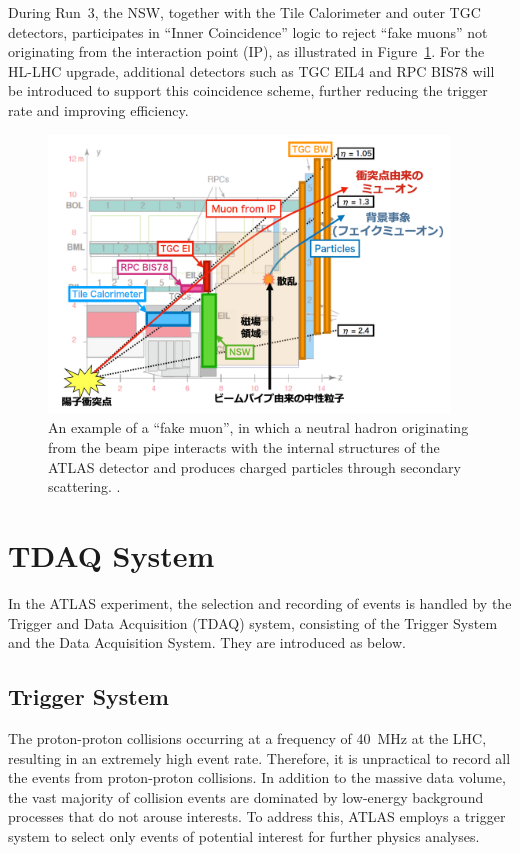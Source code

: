During Run~3, the NSW, together with the Tile Calorimeter and outer TGC detectors, participates in “Inner Coincidence” logic to reject ``fake muons'' not originating from the interaction point (IP), as illustrated in Figure~\ref{fig:InnerCoin}. For the HL-LHC upgrade, additional detectors such as TGC EIL4 and RPC BIS78 will be introduced to support this coincidence scheme, further reducing the trigger rate and improving efficiency.

\begin{figure}[htbp]
  \centering
  \includegraphics[width=0.95\textwidth]{figs/chapter2/InnerCoin.png}
  \caption{An example of a ``fake muon'', in which a neutral hadron originating from the beam pipe interacts with the internal structures of the ATLAS detector and produces charged particles through secondary scattering. \cite{kawamoto}.}
  \label{fig:InnerCoin}
\end{figure}

\section{TDAQ System} \label{sec:TDAQSystem}
In the ATLAS experiment, the selection and recording of events is handled by the Trigger and Data Acquisition (TDAQ) system, consisting of the Trigger System and the Data Acquisition System. They are introduced as below.
\subsection{Trigger System}
The proton-proton collisions occurring at a frequency of 40~MHz at the LHC, resulting in an extremely high event rate. Therefore, it is unpractical to record all the events from proton-proton collisions. In addition to the massive data volume, the vast majority of collision events are dominated by low-energy background processes that do not arouse interests. To address this, ATLAS employs a trigger system to select only events of potential interest for further physics analyses.

